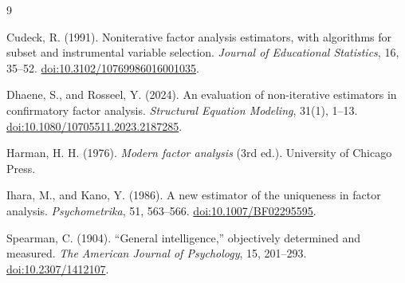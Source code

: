 \documentclass[11pt]{article}
\theoremstyle{plain}
\theoremstyle{remark}
\begin{document}
\begin{thebibliography}{9}

Cudeck, R. (1991).
Noniterative factor analysis estimators, with algorithms for subset and
instrumental variable selection.
\emph{Journal of Educational Statistics}, 16, 35--52.
\href{https://doi.org/10.3102/10769986016001035}{doi:10.3102/10769986016001035}.

Dhaene, S., and Rosseel, Y. (2024).
An evaluation of non-iterative estimators in confirmatory factor analysis.
\emph{Structural Equation Modeling}, 31(1), 1--13.
\href{https://doi.org/10.1080/10705511.2023.2187285}{doi:10.1080/10705511.2023.2187285}.

Harman, H. H. (1976).
\emph{Modern factor analysis} (3rd ed.).
University of Chicago Press.

Ihara, M., and Kano, Y. (1986).
A new estimator of the uniqueness in factor analysis.
\emph{Psychometrika}, 51, 563--566.
\href{https://doi.org/10.1007/BF02295595}{doi:10.1007/BF02295595}.

Spearman, C. (1904).
``General intelligence,'' objectively determined and measured.
\emph{The American Journal of Psychology}, 15, 201--293.
\href{https://doi.org/10.2307/1412107}{doi:10.2307/1412107}.

\end{thebibliography}
\end{document}

